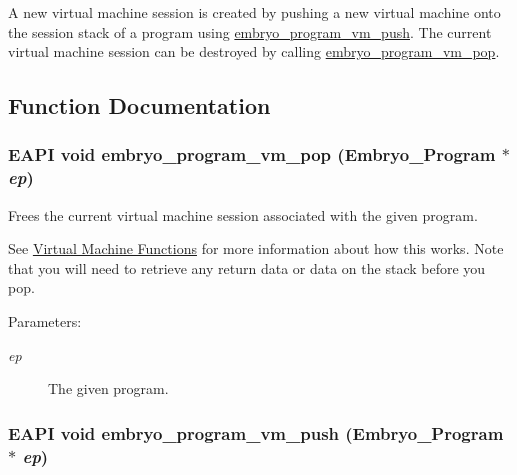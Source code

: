 A new virtual machine session is created by pushing a new virtual machine onto the session stack of a program using \hyperlink{group__Embryo__Program__VM__Group_g4c0362643f9ae872754caabe32ad9764}{embryo\_\-program\_\-vm\_\-push}. The current virtual machine session can be destroyed by calling \hyperlink{group__Embryo__Program__VM__Group_g41d2fb01dff4ca61a4eb47554d4859fe}{embryo\_\-program\_\-vm\_\-pop}. 

\subsection{Function Documentation}
\hypertarget{group__Embryo__Program__VM__Group_g41d2fb01dff4ca61a4eb47554d4859fe}{
\subsubsection{\setlength{\rightskip}{0pt plus 5cm}EAPI void embryo\_\-program\_\-vm\_\-pop (Embryo\_\-Program $\ast$ {\em ep})}}
\label{group__Embryo__Program__VM__Group_g41d2fb01dff4ca61a4eb47554d4859fe}


Frees the current virtual machine session associated with the given program. 

See \hyperlink{group__Embryo__Program__VM__Group}{Virtual Machine Functions} for more information about how this works. Note that you will need to retrieve any return data or data on the stack before you pop.

\begin{Desc}
\item[Parameters:]
\begin{description}
\item[{\em ep}]The given program. \end{description}
\end{Desc}
\hypertarget{group__Embryo__Program__VM__Group_g4c0362643f9ae872754caabe32ad9764}{
\subsubsection{\setlength{\rightskip}{0pt plus 5cm}EAPI void embryo\_\-program\_\-vm\_\-push (Embryo\_\-Program $\ast$ {\em ep})}}
\label{group__Embryo__Program__VM__Group_g4c0362643f9ae872754caabe32ad9764}


